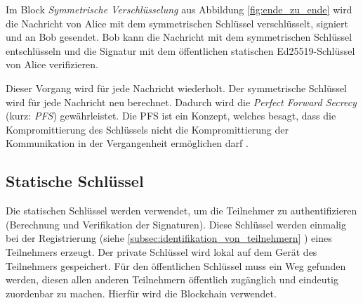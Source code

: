 Im Block \textit{Symmetrische Verschlüsselung} aus Abbildung \ref{fig:ende_zu_ende} wird die Nachricht von Alice mit dem symmetrischen Schlüssel verschlüsselt, signiert und an Bob gesendet. Bob kann die Nachricht mit dem symmetrischen Schlüssel entschlüsseln und die Signatur mit dem öffentlichen statischen Ed25519-Schlüssel von Alice verifizieren.

Dieser Vorgang wird für jede Nachricht wiederholt. Der symmetrische Schlüssel wird für jede Nachricht neu berechnet. Dadurch wird die \textit{Perfect Forward Secrecy} (kurz: \textit{PFS}) gewährleistet. Die PFS ist ein Konzept, welches besagt, dass die Kompromittierung des Schlüssels nicht die Kompromittierung der Kommunikation in der Vergangenheit ermöglichen darf \parencite[S. 921-922]{Krawczyk_PerfectForwardSecrecy}.


\subsection{Statische Schlüssel}

Die statischen Schlüssel werden verwendet, um die Teilnehmer zu authentifizieren (Berechnung und Verifikation der Signaturen). Diese Schlüssel werden einmalig bei der Registrierung (siehe \ref{subsec:identifikation_von_teilnehmern} \textit{}) eines Teilnehmers erzeugt. Der private Schlüssel wird lokal auf dem Gerät des Teilnehmers gespeichert. Für den öffentlichen Schlüssel muss ein Weg gefunden werden, diesen allen anderen Teilnehmern öffentlich zugänglich und eindeutig zuordenbar zu machen. Hierfür wird die Blockchain verwendet. 

